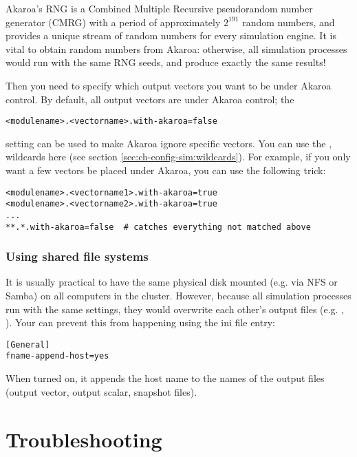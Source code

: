 Akaroa's RNG is a Combined Multiple Recursive pseudorandom
number generator (CMRG) with a period of approximately $2^{191}$
random numbers, and provides a unique stream of random numbers
for every simulation engine. It is vital to obtain random numbers
from Akaroa: otherwise, all simulation processes would run with the same
RNG seeds, and produce exactly the same results!

Then you need to specify which output vectors you want to
be under Akaroa control. By default, all output vectors are under Akaroa
control; the

\begin{verbatim}
<modulename>.<vectorname>.with-akaroa=false
\end{verbatim}

setting can be used to make Akaroa ignore specific vectors.
You can use the \ttt{*}, \ttt{**} wildcards here (see
section \ref{sec:ch-config-sim:wildcards}). For example,
if you only want a few vectors be placed under Akaroa,
you can use the following trick:

\begin{verbatim}
<modulename>.<vectorname1>.with-akaroa=true
<modulename>.<vectorname2>.with-akaroa=true
...
**.*.with-akaroa=false  # catches everything not matched above
\end{verbatim}


\subsubsection{Using shared file systems}
\label{sec:run-sim:using-shared-filesystems}

It is usually practical to have the same physical disk mounted (e.g. via NFS or Samba)
on all computers in the cluster. However, because all {\opp} simulation
processes run with the same settings, they would overwrite each other's
output files (e.g. , ).
Your can prevent this from happening using the
 ini file entry:

\begin{verbatim}
[General]
fname-append-host=yes
\end{verbatim}

When turned on, it appends the host name to the names of the output
files (output vector, output scalar, snapshot files).



\section{Troubleshooting}

